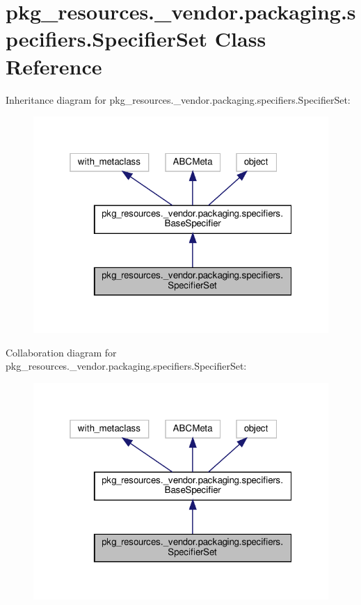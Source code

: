 \hypertarget{classpkg__resources_1_1__vendor_1_1packaging_1_1specifiers_1_1SpecifierSet}{}\section{pkg\+\_\+resources.\+\_\+vendor.\+packaging.\+specifiers.\+Specifier\+Set Class Reference}
\label{classpkg__resources_1_1__vendor_1_1packaging_1_1specifiers_1_1SpecifierSet}


Inheritance diagram for pkg\+\_\+resources.\+\_\+vendor.\+packaging.\+specifiers.\+Specifier\+Set\+:
\nopagebreak
\begin{figure}[H]
\begin{center}
\leavevmode
\includegraphics[width=319pt]{classpkg__resources_1_1__vendor_1_1packaging_1_1specifiers_1_1SpecifierSet__inherit__graph}
\end{center}
\end{figure}


Collaboration diagram for pkg\+\_\+resources.\+\_\+vendor.\+packaging.\+specifiers.\+Specifier\+Set\+:
\nopagebreak
\begin{figure}[H]
\begin{center}
\leavevmode
\includegraphics[width=319pt]{classpkg__resources_1_1__vendor_1_1packaging_1_1specifiers_1_1SpecifierSet__coll__graph}
\end{center}
\end{figure}
